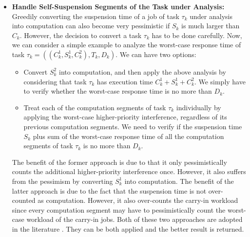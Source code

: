 \begin{itemize}
\item {\bf Handle Self-Suspension Segments of the Task under Analysis:} Greedily converting the suspension time of a job of task $\tau_k$ under analysis into computation can also become very pessimistic if $S_k$ is much larger than $C_k$. However, the decision to convert a task $\tau_k$ has to be done carefully. Now, we can consider a simple example to analyze the worst-case response time of task $\tau_k = ((C_k^1, S_k^1, C_k^2), T_k, D_k)$. We can have two options:
\begin{itemize}
\item Convert $S_k^2$ into computation, and then apply the above analysis by considering that task $\tau_k$ has execution time $C_k^1+S_k^1+C_k^2$. We simply have to verify whether the worst-case response time is no more than $D_k$.
\item Treat each of the computation segments of task $\tau_k$ individually by applying the worst-case higher-priority interference, regardless of its previous computation segments. We need to verify if the suspension time $S_k$ plus sum of the worst-case response time of all the computation segments of task $\tau_k$ is no more than $D_k$. 
\end{itemize}
The benefit of the former approach is due to that it only pessimistically counts the additional higher-priority interference once. However, it also suffers from the pessimism by converting $S_k^1$ into computation. The benefit of the latter approach is due to the fact that the suspension time is not over-counted as computation. However, it also over-counts the carry-in workload since every computation segment may have to pessimistically count the worst-case workload of the carry-in jobs. Both of these two approaches are adopted in the literature \cite{ecrts15nelissen,Huang:multiseg,RTCSA-BletsasA05}. They can be both applied and the better result is returned.


\end{itemize}

